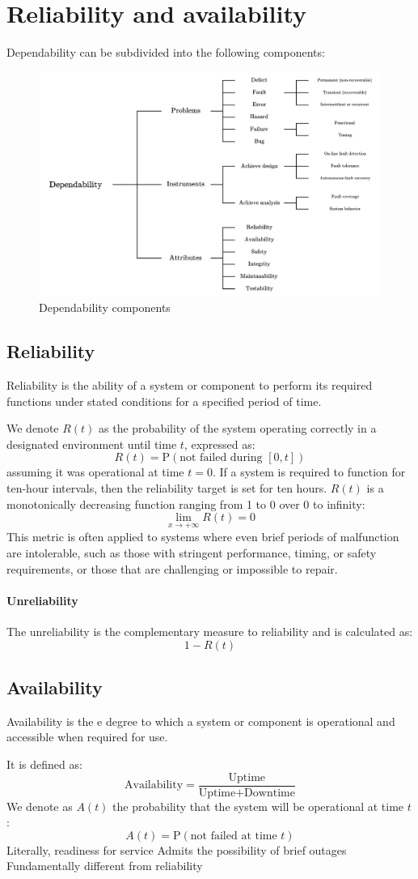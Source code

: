 \section{Reliability and availability}

Dependability can be subdivided into the following components:
\begin{figure}[H]
    \centering
    \includegraphics[width=0.6\linewidth]{images/dep1.png}
    \caption{Dependability components}
\end{figure}

\subsection{Reliability}
\begin{definition}
    Reliability is the ability of a system or component to perform its required functions under stated conditions for a specified period of time. 
\end{definition}
We denote $R(t)$ as the probability of the system operating correctly in a designated environment until time $t$, expressed as:
\[R(t)=\text{P}(\text{not failed during }[0,t])\]
assuming it was operational at time $t = 0$.
If a system is required to function for ten-hour intervals, then the reliability target is set for ten hours.
$R(t)$ is a monotonically decreasing function ranging from 1 to 0 over 0 to infinity:
\[\lim_{x\rightarrow + \infty}R(t)=0\]
This metric is often applied to systems where even brief periods of malfunction are intolerable, such as those with stringent performance, timing, or safety requirements, or those that are challenging or impossible to repair.
\paragraph*{Unreliability}
The unreliability is the complementary measure to reliability and is calculated as:
\[1-R(t)\]

\subsection{Availability}
\begin{definition}
    Availability is the e degree to which a system or component is operational and accessible when required for use. 
\end{definition}
It is defined as: 
\[\text{Availability}=\dfrac{\text{Uptime}}{\text{Uptime}+\text{Downtime}}\]
We denote as $A(t)$ the probability that the system will be operational at time $t$: 
\[A(t)=\text{P}(\text{not failed at time }t)\]
Literally, readiness for service
Admits the possibility of brief outages
Fundamentally different from reliability
